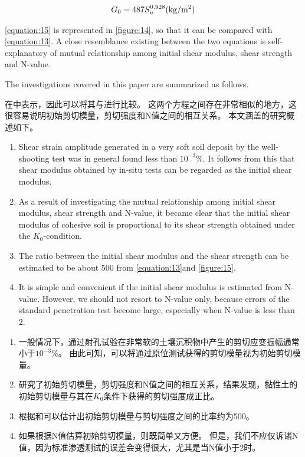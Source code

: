 \begin{align}
    G_0=487S_u^{0.928}(\rm{kg/m^2})
    \label{equation:15}
\end{align}

\begin{paracol}{2}

    \autoref{equation:15} is represented in \autoref{figure:14}, so that it can be compared with \autoref{equation:13}. A close resemblance existing between the two equations is self-explanatory of mutual relationship among initial shear modulus, shear strength and N-value.

    The investigations covered in this paper are summarized as follows.

    \switchcolumn

    在中表示，因此可以将其与进行比较。 这两个方程之间存在非常相似的地方，这很容易说明初始剪切模量，剪切强度和N值之间的相互关系。
    本文涵盖的研究概述如下。

    \switchcolumn*

    \begin{enumerate}
        \item Shear strain amplitude generated in a very soft soil deposit by the well-shooting test was in general found less than $10^{-3}\%$. It follows from this that shear modulus obtained by in-situ tests can be regarded as the initial shear modulus.
        \item As a result of investigating the mutual relationship among initial shear modulus, shear strength and N-value, it became clear that the initial shear modulus of cohesive soil is proportional to its shear strength obtained under the $K_0$-condition.
        \item The ratio between the initial shear modulus and the shear strength can be estimated to be about 500 from \autoref{equation:13}and \autoref{figure:15}.
        \item It is simple and convenient if the initial shear modulus is estimated from N-value. However, we should not resort to N-value only, because errors of the standard penetration test become large, especially when N-value is less than 2.
    \end{enumerate}
    
    \switchcolumn

    \begin{enumerate}
        \item 一般情况下，通过射孔试验在非常软的土壤沉积物中产生的剪切应变振幅通常小于$10^{-3}\%$。 由此可知，可以将通过原位测试获得的剪切模量视为初始剪切模量。
        \item 研究了初始剪切模量，剪切强度和N值之间的相互关系，结果发现，黏性土的初始剪切模量与其在$K_0$条件下获得的剪切强度成正比。
        \item 根据和可以估计出初始剪切模量与剪切强度之间的比率约为500。
        \item 如果根据N值估算初始剪切模量，则既简单又方便。 但是，我们不应仅诉诸N值，因为标准渗透测试的误差会变得很大，尤其是当N值小于2时。
    \end{enumerate}

\end{paracol}